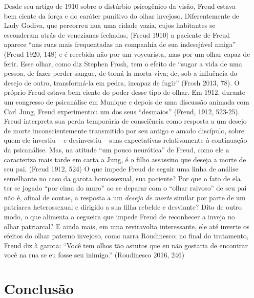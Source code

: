 Desde seu artigo de 1910 sobre o distúrbio psicogênico da visão, Freud
estava bem ciente da força e do caráter punitivo do olhar invejoso.
Diferentemente de Lady Godiva, que percorreu nua uma cidade vazia, cujos
habitantes se esconderam atrás de venezianas fechadas, (Freud 1910) a
paciente de Freud aparece ``nas ruas mais frequentadas na companhia de
sua indesejável amiga'' (Freud 1920, 148) e é recebida não por um
voyeurista, mas por um olhar capaz de ferir. Esse olhar, como diz
Stephen Frosh, tem o efeito de ``sugar a vida de uma pessoa, de fazer
perder sangue, de torná-la morta-viva; de, sob a influência do desejo de
outro, transformá-la em pedra, incapaz de fugir'' (Frosh 2013, 78). O
próprio Freud estava bem ciente do poder desse tipo de olhar. Em 1912,
durante um congresso de psicanálise em Munique e depois de uma discussão
animada com Carl Jung, Freud experimentou um dos seus ``desmaios'' (Freud,
1912, 523-25). Freud interpreta sua perda temporária de consciência como
resposta a um desejo de morte inconscientemente transmitido por seu
antigo e amado discípulo, sobre quem ele investiu -- e desinvestiu --
suas expectativas relativamente à continuação da psicanálise. Mas, na
atitude ``um pouco neurótica'' de Freud, como ele a caracteriza mais tarde
em carta a Jung, é o filho assassino que deseja a morte de seu pai.
(Freud 1912, 524) O que impede Freud de seguir uma linha de análise
semelhante no caso da garota homossexual, sua paciente? Por que o fato
de ela ter se jogado ``por cima do muro'' ao se deparar com o ``olhar
raivoso'' de seu pai não é, afinal de contas, a resposta a um
\emph{desejo de morte} similar por parte de um patriarca heterossexual e
dirigido a sua filha rebelde e desviante? Dito de outro modo, o que
alimenta a cegueira que impede Freud de reconhecer a inveja no olhar
patriarcal? E ainda mais, em uma reviravolta interessante, ele até
inverte os efeitos do olhar paterno invejoso, como narra Roudinesco; no
final do tratamento, Freud diz à garota: ``Você tem olhos tão astutos
que eu não gostaria de encontrar você na rua se eu fosse seu inimigo.''
(Roudinesco 2016, 246)

\section{Conclusão}

